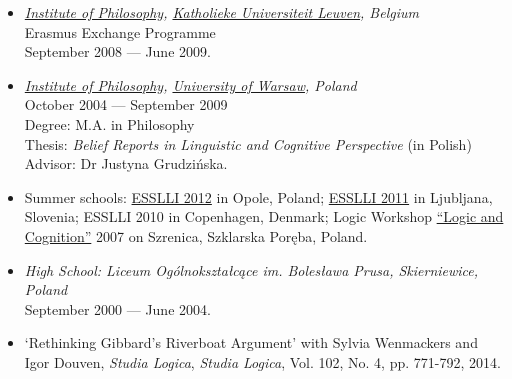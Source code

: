 \documentclass[a4paper,12pt]{article}
\begin{document}
\begin{small}
  
  \begin{itemize}
  \item \emph{\href{http://hiw.kuleuven.be/eng/}{Institute of Philosophy}, \href{http://www.kuleuven.be}{Katholieke Universiteit Leuven}, Belgium}\\
    Erasmus Exchange Programme\\
    September 2008 --- June 2009.
    
  \item \emph{\href{http://www.filozofia.uw.edu.pl}{Institute of
        Philosophy}, \href{http://www.uw.edu.pl}{University of Warsaw}, Poland}\\
    October 2004 --- September 2009\\
    Degree: M.A. in Philosophy\\
    Thesis: \emph{Belief Reports in Linguistic and Cognitive
      Perspective} (in Polish)\\
    Advisor: Dr Justyna Grudzińska.
    


  \item Summer schools: %
    \href{http://www.esslli2012.pl}{ESSLLI 2012} in Opole, Poland;
    \href{http://esslli2011.ijs.si}{ESSLLI 2011} in Ljubljana,
    Slovenia;
    ESSLLI 2010 in Copenhagen, Denmark;
    Logic Workshop
    \href{http://www.logika.uw.edu.pl/warsztaty2007/index.html}{``Logic
      and Cognition''} 2007 on Szrenica, Szklarska Poręba, Poland.

  \item \emph{High School: Liceum Ogólnokształcące im. Bolesława
      Prusa, Skierniewice, Poland}\\
    September 2000 --- June 2004.

  \end{itemize}


  \begin{itemize}
    \item `Rethinking Gibbard's Riverboat Argument' with Sylvia
    Wenmackers and Igor Douven, \emph{Studia Logica}, \emph{Studia Logica}, Vol. 102,
No. 4, pp. 771-792, 2014.


\end{itemize}
\end{small}
\end{document}
